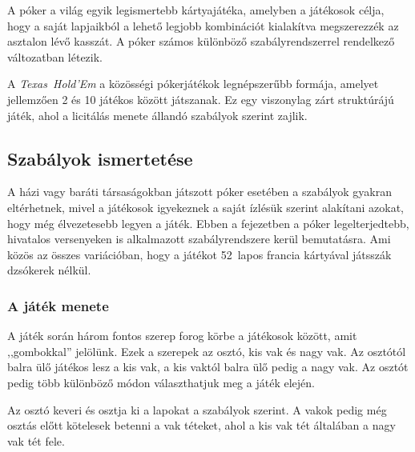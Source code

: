 \documentclass[]{thesis-ekf}
\theoremstyle{definition}
\theoremstyle{remark}
\begin{document}
A póker a világ egyik legismertebb kártyajátéka, amelyben a játékosok célja, hogy a saját lapjaikból a lehető legjobb kombinációt kialakítva megszerezzék az asztalon lévő kasszát. A póker számos különböző szabályrendszerrel rendelkező változatban létezik.

A \emph{Texas~Hold’Em} a közösségi pókerjátékok legnépszerűbb formája, amelyet jellemzően 2 és 10 játékos között játszanak. Ez egy viszonylag zárt struktúrájú játék, ahol a licitálás menete állandó szabályok szerint zajlik.

\subsection{Szabályok ismertetése}

A házi vagy baráti társaságokban játszott póker esetében a szabályok gyakran eltérhetnek, mivel a játékosok igyekeznek a saját ízlésük szerint alakítani azokat, hogy még élvezetesebb legyen a játék. Ebben a fejezetben a póker legelterjedtebb, hivatalos versenyeken is alkalmazott szabályrendszere kerül bemutatásra. Ami közös az összes variációban, hogy a játékot 52~lapos francia kártyával játsszák dzsókerek nélkül.

\subsubsection{A játék menete \cite{WikipediaTexasholdem}}

A játék során három fontos szerep forog körbe a játékosok között, amit ,,gombokkal'' jelölünk. Ezek a szerepek az osztó, kis vak és nagy vak. Az osztótól balra ülő játékos lesz a kis vak, a kis vaktól balra ülő pedig a nagy vak. Az osztót pedig több különböző módon választhatjuk meg a játék elején.  

Az osztó keveri és osztja ki a lapokat a szabályok szerint. A vakok pedig még osztás előtt kötelesek betenni a vak téteket, ahol a kis vak tét általában a nagy vak tét fele.
\end{document}
